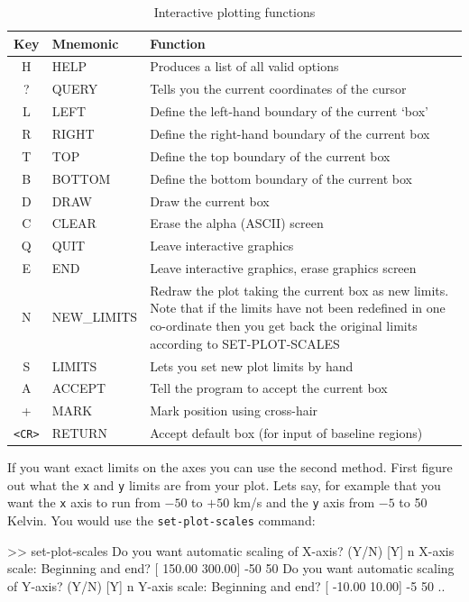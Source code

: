 \documentclass[11pt,twoside]{starlink}
\begin{document}
\begin{table}[htbp]
\begin{center}
\caption{Interactive plotting functions}
\begin{tabular}{|c|l|p{3.7in}|} \hline
Key	& Mnemonic	& Function \\ \hline
H	&HELP	&Produces a list of all valid options\\
?	&QUERY	&Tells you the current coordinates of the cursor\\
L	&LEFT	&Define the left-hand boundary of the current `box'\\
R	&RIGHT	&Define the right-hand boundary of the current box\\
T	&TOP	&Define the top boundary of the current box\\
B	&BOTTOM	&Define the bottom boundary of the current box\\
D	&DRAW	&Draw the current box\\
C	&CLEAR	&Erase the alpha (ASCII) screen\\
Q	&QUIT	&Leave interactive graphics\\
E	&END	&Leave interactive graphics, erase graphics screen\\
N	&NEW\_LIMITS    &
Redraw the plot taking the current box as new
            limits. Note that if the limits have not been
            redefined in one co-ordinate then you get back the
            original limits according to SET-PLOT-SCALES\\
S	&LIMITS	&Lets you set new plot limits by hand\\
A	&ACCEPT	&Tell the program to accept the current box\\
+	&MARK	&Mark position using cross-hair\\
\verb+<CR>+ &RETURN &Accept default box (for input of baseline regions)\\ \hline
\end{tabular}
\label{tab:specx}
\end{center}
\end{table}


If you want exact limits on the axes you can use the second
method. First figure out what the \texttt{x} and \texttt{y} limits are from
your plot. Lets say, for example that you want the \texttt{x} axis to run
from $-50$ to $+50$ km/s and the \texttt{y} axis from $-5$ to 50 Kelvin.
You would use the \texttt{set-plot-scales} command:

\begin{terminalv}
>> set-plot-scales
Do you want automatic scaling of X-axis? (Y/N) [Y] n
X-axis scale: Beginning and end? [ 150.00  300.00] -50 50
Do you want automatic scaling of Y-axis? (Y/N) [Y] n
Y-axis scale: Beginning and end? [ -10.00   10.00] -5 50
..
\end{terminalv}
\end{document}
